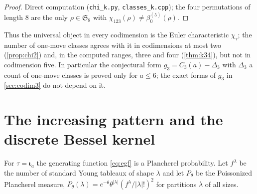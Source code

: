 \documentclass[11pt,reqno]{amsart}
\theoremstyle{plain}
\theoremstyle{definition}
\theoremstyle{remark}
\let\greekiota\iota
\renewcommand{\iota}{\boldsymbol{\greekiota}}
\newcommand{\Sym}{\mathfrak{S}}
\newcommand{\bz}{\beta_0}
\begin{document}
\begin{proof}
Direct computation (\texttt{chi\_k.py}, \texttt{classes\_k.cpp}); the four permutations of length $8$ are the only $\rho\in\Sym_8$ with $\chi_{123}(\rho)\ne\bz^{(5)}(\rho)$.
\end{proof}

Thus the universal object in every codimension is the Euler characteristic $\chi_\tau$; the number of one-move classes agrees with it in codimensions at most two (\cref{prop:chi2}) and, in the computed ranges, three and four (\cref{thm:k34}), but not in codimension five. In particular the conjectural form $g_3=C_3(a)-\Delta_3$ with $\Delta_3$ a count of one-move classes is proved only for $a\le6$; the exact forms of $g_3$ in \cref{sec:codim3} do not depend on it.

\section{The increasing pattern and the discrete Bessel kernel}\label{sec:monotone}

For $\tau=\iota_a$ the generating function \eqref{eq:egf} is a Plancherel probability. Let $f^\lambda$ be the number of standard Young tableaux of shape $\lambda$ and let $P_\theta$ be the Poissonized Plancherel measure, $P_\theta(\lambda)=e^{-\theta}\theta^{|\lambda|}(f^\lambda/|\lambda|!)^2$ for partitions $\lambda$ of all sizes. 
\end{document}
